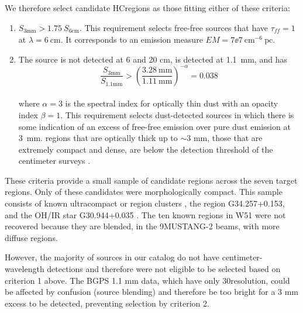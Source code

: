 \documentclass[twocolumn]{aastex62}
\newcommand{\MUSTANG}{MUSTANG-2\xspace}
\begin{document}
We therefore select candidate HC\hii regions
as those fitting either of these criteria:
\begin{enumerate}
    \item $S_{3 \mathrm{mm}} > 1.75~S_{6\mathrm{cm}}$.  %
        This requirement selects free-free sources that have $\tau_\textit{ff}=1$
        at ${\lambda={6~\mathrm{cm}}}$.  It corresponds to an emission
        measure ${EM=7\ee{7}~\mathrm{cm}^{-6}~\mathrm{pc}}$.
    \item
        The source is not detected at 6 and 20 cm, is detected at 1.1~mm, and has
        \begin{equation}
            \frac{S_{3\mathrm{mm}}}{S_{1.1\mathrm{mm}}} > \left(\frac{3.28~\mathrm{mm}}
            {1.11~\mathrm{mm}}\right)^{-\alpha} = 0.038
        \end{equation}\\
        where $\alpha=3$ is the spectral
        index for optically thin dust with an opacity index $\beta=1$.  This
        requirement selects dust-detected sources in which there is some
        indication of an excess of free-free emission over pure dust emission
        at 3~mm.
        \hchii regions that are optically
        thick up to $\sim3$ mm, those that are extremely compact and dense,
        are below the detection threshold of the centimeter surveys
        \citep[$\approx2.5$ mJy at 6 cm;][]{Giveon2005a,Hoare2012a}.
\end{enumerate}

These criteria provide a small sample of \nhiicand candidate \hchii regions
across the seven target regions.  Only \ncompacthiicand of these candidates
were morphologically compact. This sample consists of known
ultracompact or \hchii region clusters \citep[three are parts of
W49A, which contains 12 sources that can be classified as \hchii
regions;][]{De-Pree1997a},
the \hchii region G34.257+0.153, and the OH/IR star G30.944+0.035 \citep{Wilson1972a}.
The ten known \hchii regions in W51 \citep{Ginsburg2016b} were not recovered because
they are blended, in the 9\arcsec \MUSTANG beams, with more diffuse \hii regions.

However, the majority of sources in our catalog do not have
centimeter-wavelength detections and therefore were not
eligible to be selected based on criterion 1 above.  The BGPS 1.1 mm data,
which have only 30\arcsec resolution, could be affected by confusion (source blending)
and therefore be too bright for a 3 mm excess to be detected, preventing
selection by criterion 2.
\end{document}
